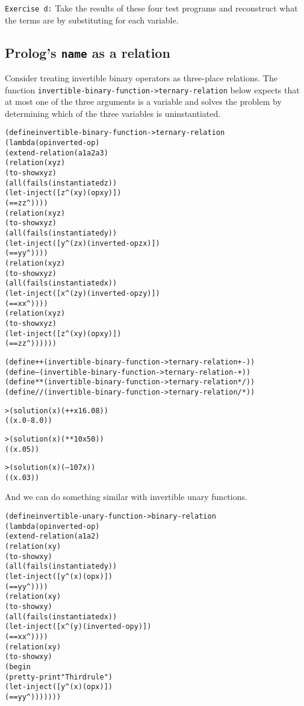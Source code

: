 \texttt{Exercise d:} Take the results of these four test programs and
reconstruct what the terms are by substituting for each variable.\endofexercise

\subsection{Prolog's \texttt{name} as a relation}

Consider treating invertible binary operators as three-place
relations. The function
\texttt{invertible-binary-function->ternary-relation} below expects
that at most one of the three arguments is a variable and solves the
problem by determining which of the three variables is uninstantiated.

\begin{alltt}
(define invertible-binary-function->ternary-relation
  (lambda (op inverted-op)
    (extend-relation (a1 a2 a3)
      (relation (x y z)
        (to-show x y z)
        (all (fails (instantiated z))
          (let-inject ([z^ (x y) (op x y)])
            (== z z^))))
      (relation (x y z)
        (to-show x y z)
        (all (fails (instantiated y))
          (let-inject ([y^ (z x) (inverted-op z x)])
            (== y y^))))
      (relation (x y z)
        (to-show x y z)
        (all (fails (instantiated x))
          (let-inject ([x^ (z y) (inverted-op z y)])
            (== x x^))))
      (relation (x y z)
        (to-show x y z)
        (let-inject ([z^ (x y) (op x y)])
          (== z z^))))))

(define ++ (invertible-binary-function->ternary-relation + -))
(define -- (invertible-binary-function->ternary-relation - +))
(define ** (invertible-binary-function->ternary-relation * /))
(define // (invertible-binary-function->ternary-relation / *))

> (solution (x) (++ x 16.0 8))
((x.0 -8.0))

> (solution (x) (** 10 x 50))
((x.0 5))

> (solution (x) (-- 10 7 x))
((x.0 3))
\end{alltt}

And we can do something similar with invertible unary functions.
\begin{alltt}
(define invertible-unary-function->binary-relation
  (lambda (op inverted-op)
    (extend-relation (a1 a2)
      (relation (x y)
        (to-show x y)
        (all (fails (instantiated y))
          (let-inject ([y^ (x) (op x)])
            (== y y^))))
      (relation (x y)
        (to-show x y)
        (all (fails (instantiated x))
          (let-inject ([x^ (y) (inverted-op y)])
            (== x x^))))
      (relation (x y)
        (to-show x y)
        (begin
          (pretty-print "Third rule")
          (let-inject ([y^ (x) (op x)])
            (== y y^)))))))
\end{alltt}

